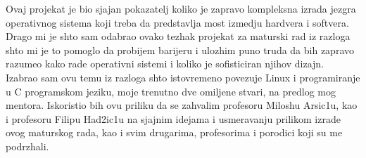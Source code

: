 \documentclass[a4paper,fleqn,12pt]{JMThesis}
\newcommand\eng{\fontencoding{OT1}\fontfamily{\rmdefault}\selectfont}
\begin{document}
\newpage

Ovaj projekat je bio sjajan pokazatelj koliko je zapravo kompleksna izrada
jezgra operativnog sistema koji treba da predstavlja most izmedju hardvera i
softvera. Drago mi je shto sam odabrao ovako tezhak projekat za maturski rad iz
razloga shto mi je to pomoglo da probijem barijeru i ulozhim puno truda da bih
zapravo razumeo kako rade operativni sistemi i koliko je sofisticiran njihov
dizajn.\\

Izabrao sam ovu temu iz razloga shto istovremeno povezuje {\eng Linux} i
programiranje u {\eng C} programskom jeziku, moje trenutno dve omiljene stvari,
na predlog mog mentora. Iskoristio bih ovu priliku da se zahvalim profesoru
Miloshu Arsic1u, kao i profesoru Filipu Had2ic1u na sjajnim idejama i
usmeravanju prilikom izrade ovog maturskog rada, kao i svim drugarima,
profesorima i porodici koji su me podrzhali.


\thispagestyle{empty}
\mbox{}
\clearpage

\nocite{*}
\printbibliography[heading=bibintoc,title={Literatura}]
\end{document}
